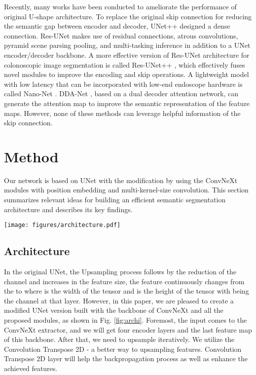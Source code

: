 \documentclass[conference]{IEEEtran}
\begin{document}
Recently, many works have been conducted to ameliorate the performance of original U-shape architecture. To replace the original skip connection for reducing the semantic gap between encoder and decoder, UNet++ \cite{unet++} designed a dense connection. Res-UNet \cite{resunet} makes use of residual connections, atrous convolutions, pyramid scene parsing pooling, and multi-tasking inference in addition to a UNet encoder/decoder backbone. A more effective version of Res-UNet architecture for colonoscopic image segmentation is called Res-UNet++ \cite{jha2019resunet++}, which effectively fuses novel modules to improve the encoding and skip operations. A lightweight model with low latency that can be incorporated with low-end endoscope hardware is called Nano-Net \cite{nano}. DDA-Net \cite{dda}, based on a dual decoder attention network, can generate the attention map to improve the semantic representation of the feature maps. However, none of these methods can leverage helpful information of the skip connection.







\section{Method}
\label{sec:ProposedMethod}
Our network is based on UNet with the modification by using the ConvNeXt modules with position embedding and multi-kernel-size convolution. This section summarizes relevant ideas for building an efficient semantic segmentation architecture and describes its key findings.

\begin{figure*}[ht]
    \centering
    \texttt{[image: figures/architecture.pdf]}
    \caption{An overview of the proposed method. }
    \label{fig:archi}
\end{figure*}

\subsection{Architecture}

In the original UNet, the Upsampling process follows by the reduction of the channel and increases in the feature size, the feature continuously changes from the  to  where  is the width of the tensor and  is the height of the tensor with  being the channel at that layer. However, in this paper, we are pleased to create a modified UNet version built with the backbone of ConvNeXt and all the proposed modules, as shown in Fig. \ref{fig:archi}. Foremost, the input comes to the ConvNeXt extractor, and we will get four encoder layers and the last feature map of this backbone. After that, we need to upsample iteratively. We utilize the Convolution Transpose 2D \cite{convtrans} - a better way to upsampling features. Convolution Transpose 2D layer will help the backpropagation process as well as enhance the achieved features.
\end{document}
